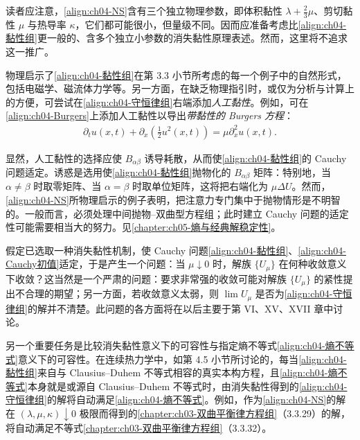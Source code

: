 \documentclass[../../main.tex]{subfiles}
\begin{document}
读者应注意，\eqref{align:ch04-NS}含有三个独立物理参数，即体积黏性 $\lambda+\tfrac{2}{3}\mu$、剪切黏性 $\mu$ 与热导率 $\kappa$，它们都可能很小，但量级不同。因而应准备考虑比\eqref{align:ch04-黏性组}更一般的、含多个独立小参数的消失黏性原理表述。然而，这里将不追求这一推广。

物理启示了\eqref{align:ch04-黏性组}在第 3.3 小节所考虑的每一个例子中的自然形式，包括电磁学、磁流体力学等。另一方面，在缺乏物理指引时，或仅为分析与计算上的方便，可尝试在\eqref{align:ch04-守恒律组}右端添加\emph{人工黏性}。例如，可在\eqref{align:ch04-Burgers}上添加人工黏性以导出\emph{带黏性的 Burgers 方程}：
\begin{align}
\partial_{t}u(x,t)+\partial_{x}\left(\tfrac{1}{2}u^{2}(x,t)\right)=\mu\partial_{x}^{2}u(x,t).
\label{align:ch04-Burgers黏性}
\end{align}

显然，人工黏性的选择应使 $B_{\alpha\beta}$ 诱导耗散，从而使\eqref{align:ch04-黏性组}的 Cauchy 问题适定。诱惑是选用使\eqref{align:ch04-黏性组}抛物化的 $B_{\alpha\beta}$ 矩阵：特别地，当 $\alpha\neq\beta$ 时取零矩阵、当 $\alpha=\beta$ 时取单位矩阵，这将把右端化为 $\mu\Delta U$。然而，\eqref{align:ch04-NS}所物理启示的例子表明，把注意力专门集中于抛物情形是不明智的。一般而言，必须处理中间抛物--双曲型方程组；此时建立 Cauchy 问题的适定性可能需要相当大的努力。见\cref{chapter:ch05-熵与经典解稳定性}。


假定已选取一种消失黏性机制，使 Cauchy 问题\eqref{align:ch04-黏性组}、\eqref{align:ch04-Cauchy初值}适定，于是产生一个问题：当 $\mu\downarrow 0$ 时，解族 $\{U_{\mu}\}$ 在何种收敛意义下收敛？这当然是一个严肃的问题：要求非常强的收敛可能对解族 $\{U_{\mu}\}$ 的紧性提出不合理的期望；另一方面，若收敛意义太弱，则 $\lim U_{\mu}$ 是否为\eqref{align:ch04-守恒律组}的解并不清楚。此问题的各方面将在以后主要于第 VI、XV、XVII 章中讨论。

另一个重要任务是比较消失黏性意义下的可容性与指定熵不等式\eqref{align:ch04-熵不等式}意义下的可容性。在连续热力学中，如第 4.5 小节所讨论的，每当\eqref{align:ch04-黏性组}来自与 Clausius--Duhem 不等式相容的真实本构方程，且\eqref{align:ch04-熵不等式}本身就是或源自 Clausius--Duhem 不等式时，由消失黏性得到的\eqref{align:ch04-守恒律组}的解将自动满足\eqref{align:ch04-熵不等式}。例如，作为\eqref{align:ch04-NS}的解在 $(\lambda,\mu,\kappa)\downarrow 0$ 极限而得到的\cref{chapter:ch03-双曲平衡律方程组}（3.3.29）的解，将自动满足不等式\cref{chapter:ch03-双曲平衡律方程组}（3.3.32）。
\end{document}
